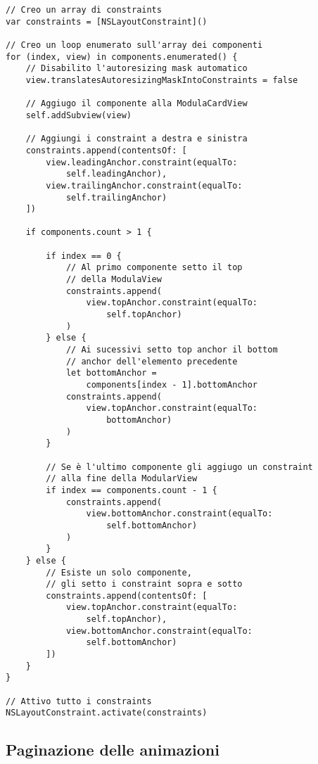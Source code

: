 \begin{verbatim}
// Creo un array di constraints
var constraints = [NSLayoutConstraint]()
    
// Creo un loop enumerato sull'array dei componenti
for (index, view) in components.enumerated() {
    // Disabilito l'autoresizing mask automatico
    view.translatesAutoresizingMaskIntoConstraints = false
    
    // Aggiugo il componente alla ModulaCardView
    self.addSubview(view)
    
    // Aggiungi i constraint a destra e sinistra
    constraints.append(contentsOf: [
        view.leadingAnchor.constraint(equalTo: 
            self.leadingAnchor),
        view.trailingAnchor.constraint(equalTo:
            self.trailingAnchor)
    ])
    
    if components.count > 1 {

        if index == 0 {
            // Al primo componente setto il top
            // della ModulaView
            constraints.append(
                view.topAnchor.constraint(equalTo:
                    self.topAnchor)
            )
        } else {
            // Ai sucessivi setto top anchor il bottom
            // anchor dell'elemento precedente
            let bottomAnchor = 
                components[index - 1].bottomAnchor
            constraints.append(
                view.topAnchor.constraint(equalTo:
                    bottomAnchor)
            )
        }
        
        // Se è l'ultimo componente gli aggiugo un constraint
        // alla fine della ModularView
        if index == components.count - 1 {
            constraints.append(
                view.bottomAnchor.constraint(equalTo:
                    self.bottomAnchor)
            )
        }
    } else {
        // Esiste un solo componente,
        // gli setto i constraint sopra e sotto
        constraints.append(contentsOf: [
            view.topAnchor.constraint(equalTo:
                self.topAnchor),
            view.bottomAnchor.constraint(equalTo:
                self.bottomAnchor)
        ])
    }
}

// Attivo tutto i constraints
NSLayoutConstraint.activate(constraints)
\end{verbatim}

\subsection{Paginazione delle animazioni}

